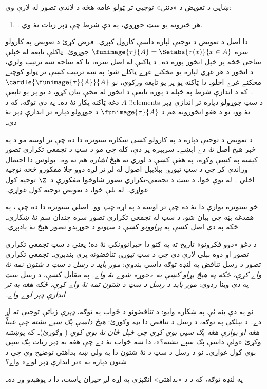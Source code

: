\documentclass[../../../include/open-logic-section]{subfiles}
\begin{document}

ښايي د تعويض د «دننۍ» توجيې تر ټولو عامه هڅه د لاندې تصور له لارې وي:
\begin{enumerate}
	\item[] \limofsize. هر څيزونه يو سټ جوړوي، په دې شرط چې ډېر زيات نۀ وي.
\end{enumerate}
دا اصل د تعويض د توجيې لپاره داسې کارول کېږي۔ فرض کړئ
د تعويض په کارولو سره
$\funimage{\tau}{A} = \Setabs{\tau(x)}{x \in A}$ جوړوئ۔
ټاکلې تابعه له خپلې ساحې څخه پر خپل انځور پوره ده۔ د ټاکنې
له اصل سره، يا که ساحه ښه ترتيب ولري، د انځور د هر غړي
لپاره يو مخکنے غړے ټاکلے شو؛ په ښه ترتيب کښې تر ټولو کوچنے
مخکنے غړے اخلو۔ دا ټاکنه يو پر يو تابعه ورکوي، نو
$\cardle{\funimage{\tau}{A}}{A}$۔ که د اندازې شرط په خپله د
پوره تابعې د انځور له مخې بيان کړو، د يو پر يو تابعې دغه
ټاکنه پکار نۀ ده۔ په دې توګه، که د $A$ !!{element}s
د سټ جوړولو دپاره تر اندازې ډېر نۀ وو، نو د هغو انځورونه هم د
$\funimage{\tau}{A}$ د جوړولو دپاره تر اندازې ډېر نۀ دي۔

د تعويض د توجيې دپاره د \limofsize{} په کارولو کښې ښکاره ستونزه دا ده
چې تر اوسه مو د \limofsize په څېر هېڅ اصل \emph{نۀ} دے اېښے۔ سربېره
پر دې، کله چې مو د سټ د تجمعي-تکراري تصور کيسه په
 کښې وکړه، په هغې کښې
د \limofsize لوري ته هېڅ \emph{اشاره} هم نۀ وه۔ بولوس دا احتمال وړاندې کړ چې د سټ تيورۍ بېلابېل اصول له لږ تر لږه دوو جلا مفکورو څخه توجيه اخلي \citeyearpar[p.~19]{Boolos1989}۔ له يوې خوا، د سټ
د تجمعي-تکراري تصور شاوخوا مفکورې د~$\Z$ توجيه کول غواړي۔ له بلې خوا،
\limofsize{} د تعويض توجيه کول غواړي۔

خو ستونزه يوازې دا نۀ ده چې تر اوسه د \limofsize په اړه \emph{چپ}
وو۔ اصلي ستونزه دا ده چې \limofsize{}، په همدغه بڼه چې بيان شو، د سټ
له تجمعي-تکراري تصور سره چندان سم نۀ ښکاري۔ ځکه په دې اصل کښې په
\emph{پړاوونو} کښې د سټونو د جوړېدو تصور هېڅ نۀ يادېږي۔

د دغو «دوو فکرونو» تاريخ ته په کتو دا حيرانوونکې نۀ ده؛ يعنې د سټ
تجمعي-تکراري تصور او \limofsize دوه بېلې لارې دي چې د سټ تيورۍ
تناقضونه پرې بندېږي۔ تجمعي-تکراري تصور د رسل تناقض په لنډه توګه داسې
بندوي: \emph{موږ بايد د رسل د سټ د شتون تمه نۀ واے کړې، ځکه په هېڅ
پړاو کښې به «جوړ» شوے نۀ واے}۔ په مقابل کښې، \limofsize{} د رسل سټ
په دې وينا ردوي: \emph{موږ بايد د رسل د سټ د شتون تمه نۀ واے کړې،
ځکه هغه به تر اندازې ډېر لوے واے}۔

نو په دې بڼه ئې په ښکاره وايو: د تناقضونو د ځواب په توګه،
\limofsize{} \emph{ډېرې} زياتې توجيې ته اړ دے۔ د بېلګې په توګه، د رسل
د تناقض دا بڼه وګورئ: \emph{هېڅ داسې پګ سپے نشته چې عيناً هغه او يوازې
هغه پګ سپي بوي کړي چې خپل ځان نۀ بوي کوي} (
وګورئ)۔ که پوښتنه وکړئ «ولې داسې پګ سپے نشته؟»، دا ښه ځواب نۀ دے چې
هغه به ډېر زيات پګ سپي بوي کول غواړي۔ نو د رسل د سټ د نۀ شتون دا به
ولې ښه بداهتي توضيح وي چې د شتون دپاره به «تر اندازې ډېر لوے» واے؟

په لنډه توګه، که د \limofsize د «بداهتي» انګېزې په اړه لږ حيران ياست،
دا د پوهېدو وړ ده۔
\end{document}
